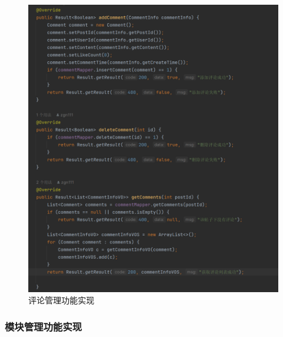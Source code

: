 \documentclass[UTF8]{ctexart}
\begin{document}
\begin{figure}[H]
  \centering
  \includegraphics[scale=0.3]{系统实现/评论功能实现.png}
  \caption{评论管理功能实现}
\end{figure}

\subsubsection{模块管理功能实现}
\end{document}
